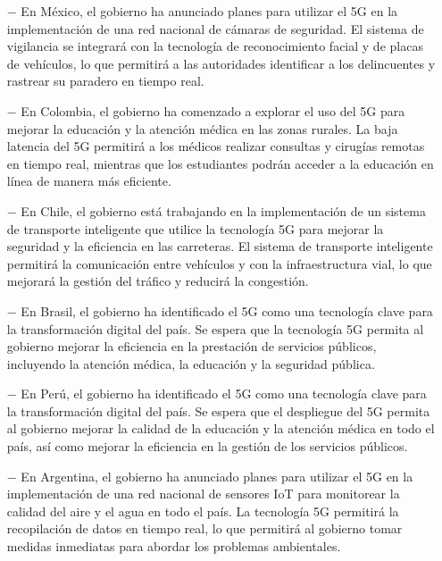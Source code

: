 \documentclass[12pt]{article}
\begin{document}
            \begin{itemize}
                \item [$-$] En México, el gobierno ha anunciado planes para utilizar el 5G en la implementación de una red nacional de cámaras de seguridad. El sistema de vigilancia se integrará con la tecnología de reconocimiento facial y de placas de vehículos, lo que permitirá a las autoridades identificar a los delincuentes y rastrear su paradero en tiempo real.
            
                \item [$-$] En Colombia, el gobierno ha comenzado a explorar el uso del 5G para mejorar la educación y la atención médica en las zonas rurales. La baja latencia del 5G permitirá a los médicos realizar consultas y cirugías remotas en tiempo real, mientras que los estudiantes podrán acceder a la educación en línea de manera más eficiente.
                
                \item [$-$] En Chile, el gobierno está trabajando en la implementación de un sistema de transporte inteligente que utilice la tecnología 5G para mejorar la seguridad y la eficiencia en las carreteras. El sistema de transporte inteligente permitirá la comunicación entre vehículos y con la infraestructura vial, lo que mejorará la gestión del tráfico y reducirá la congestión.
                
                \item [$-$] En Brasil, el gobierno ha identificado el 5G como una tecnología clave para la transformación digital del país. Se espera que la tecnología 5G permita al gobierno mejorar la eficiencia en la prestación de servicios públicos, incluyendo la atención médica, la educación y la seguridad pública.
                
                \item [$-$] En Perú, el gobierno ha identificado el 5G como una tecnología clave para la transformación digital del país. Se espera que el despliegue del 5G permita al gobierno mejorar la calidad de la educación y la atención médica en todo el país, así como mejorar la eficiencia en la gestión de los servicios públicos.
                
                \item [$-$] En Argentina, el gobierno ha anunciado planes para utilizar el 5G en la implementación de una red nacional de sensores IoT para monitorear la calidad del aire y el agua en todo el país. La tecnología 5G permitirá la recopilación de datos en tiempo real, lo que permitirá al gobierno tomar medidas inmediatas para abordar los problemas ambientales.
                

\end{itemize}
\end{document}
